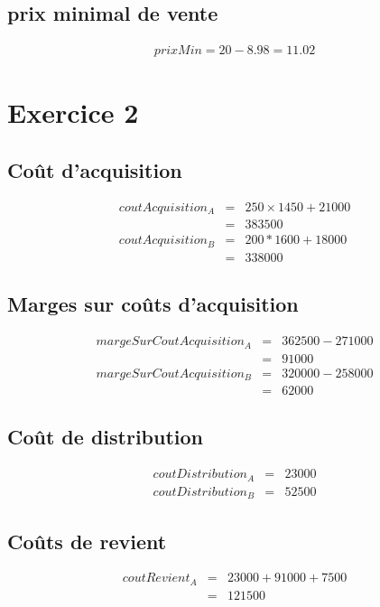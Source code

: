 \documentclass{article}
\begin{document}
	\subsection{prix minimal de vente}
		\begin{eqnarray*}
			prixMin = 20 - 8.98 = 11.02
		\end{eqnarray*}
		
	\section{Exercice 2}
	\subsection{Coût d'acquisition}
		\begin{eqnarray*}
			coutAcquisition_A &=& 250 \times 1450 + 21000 \\
			&=& 383500\\
			coutAcquisition_B &=& 200 * 1600 + 18000 \\
			&=& 338000
		\end{eqnarray*}
		\subsection{Marges sur coûts d'acquisition}
		\begin{eqnarray*}
			margeSurCoutAcquisition_A &=& 362500 - 271000\\
			&=& 91000 \\
			margeSurCoutAcquisition_B &=& 320000 - 258000\\
			&=& 62000
		\end{eqnarray*}
		\subsection{Coût de distribution}
		\begin{eqnarray*}
			coutDistribution_A &=&23000\\
			coutDistribution_B &=&52500
		\end{eqnarray*}
		\subsection{Coûts de revient}
		\begin{eqnarray*}
			coutRevient_A &=& 23000 + 91000 + 7500 \\
			&=& 121500
		\end{eqnarray*}
\end{document}
